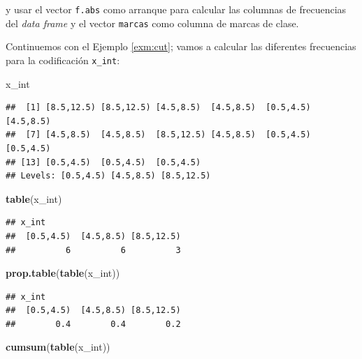 \documentclass[]{book}
\newenvironment{Shaded}{\begin{snugshade}}{\end{snugshade}}
\newcommand{\KeywordTok}[1]{\textcolor[rgb]{0.13,0.29,0.53}{\textbf{#1}}}
\newcommand{\NormalTok}[1]{#1}
\theoremstyle{definition}
\theoremstyle{definition}
\theoremstyle{definition}
\theoremstyle{remark}
\let\BeginKnitrBlock\begin \let\EndKnitrBlock\end
\begin{document}
y usar el vector \texttt{f.abs} como arranque para calcular las columnas de frecuencias del \emph{data frame} y el vector \texttt{marcas} como columna de marcas de clase.

\BeginKnitrBlock{example}
\protect\hypertarget{exm:unnamed-chunk-653}{}{\label{exm:unnamed-chunk-653} }Continuemos con el Ejemplo \ref{exm:cut}; vamos a calcular las diferentes frecuencias para la codificación \texttt{x\_int}:
\EndKnitrBlock{example}

\begin{Shaded}
\begin{Highlighting}[]
\NormalTok{x_int}
\end{Highlighting}
\end{Shaded}

\begin{verbatim}
##  [1] [8.5,12.5) [8.5,12.5) [4.5,8.5)  [4.5,8.5)  [0.5,4.5)  [4.5,8.5) 
##  [7] [4.5,8.5)  [4.5,8.5)  [8.5,12.5) [4.5,8.5)  [0.5,4.5)  [0.5,4.5) 
## [13] [0.5,4.5)  [0.5,4.5)  [0.5,4.5) 
## Levels: [0.5,4.5) [4.5,8.5) [8.5,12.5)
\end{verbatim}

\begin{Shaded}
\begin{Highlighting}[]
\KeywordTok{table}\NormalTok{(x_int)}
\end{Highlighting}
\end{Shaded}

\begin{verbatim}
## x_int
##  [0.5,4.5)  [4.5,8.5) [8.5,12.5) 
##          6          6          3
\end{verbatim}

\begin{Shaded}
\begin{Highlighting}[]
\KeywordTok{prop.table}\NormalTok{(}\KeywordTok{table}\NormalTok{(x_int))}
\end{Highlighting}
\end{Shaded}

\begin{verbatim}
## x_int
##  [0.5,4.5)  [4.5,8.5) [8.5,12.5) 
##        0.4        0.4        0.2
\end{verbatim}

\begin{Shaded}
\begin{Highlighting}[]
\KeywordTok{cumsum}\NormalTok{(}\KeywordTok{table}\NormalTok{(x_int))}
\end{Highlighting}
\end{Shaded}
\end{document}
